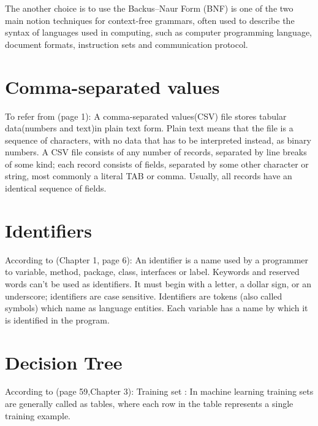 \documentclass{report}
\begin{document}
The another choice is to use the Backus–Naur Form (BNF) is one of the two main notion techniques for context-free grammars, often used to describe the syntax of languages used in computing, such as computer programming language, document formats, instruction sets and communication protocol.





\section{Comma-separated values}
\label{sec:csv}

To refer from \cite{Wikipedia_CommaSeparatedValues}(page 1): A comma-separated values(CSV) file stores tabular data(numbers and text)in plain text form. Plain text means that the file is a sequence of characters, with no data that has to be interpreted instead, as binary numbers. A CSV file consists of any number of records, separated by line breaks of some kind; each record consists of fields, separated by some other character or string, most commonly a literal TAB or comma. Usually, all records have an identical sequence of fields.


\section{Identifiers}
\label{sec:ide}

According to \cite{Roberts2000CompleteJava2Certification}(Chapter 1, page 6): An identifier is a name used by a programmer to variable, method, package, class, interfaces or label. Keywords and reserved words can't be used as  identifiers. It must begin with a letter, a dollar sign, or an underscore; identifiers are case sensitive. Identifiers are tokens (also called symbols) which name as language entities. Each variable has a name by which it is identified in the program.

\section{Decision Tree}
According to \cite{Mitchell1997MachineLearning}(page 59,Chapter 3): Training set : In machine learning training sets are generally called as tables, where each row in the table represents a single training example. 
\end{document}
